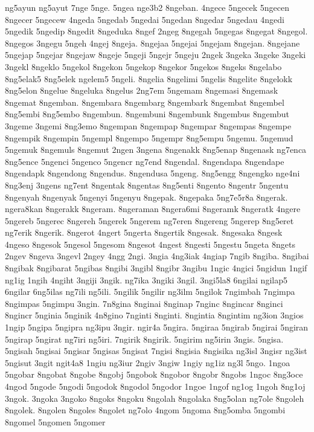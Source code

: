 {ng5ayun ng5ayut 7nge 5nge. 5ngea nge3b2 8ngeban. 4ngece 5ngecek 5ngecen
8ngecer 5ngecew 4ngeda 5ngedab 5ngedai 5ngedan 8ngedar 5ngedau 4ngedi
5ngedik 5ngedip 8ngedit 8ngeduka 8ngef 2ngeg 8ngegah 5ngegas 8ngegat
8ngegol. 8ngegos 3ngegu 5ngeh 4ngej 8ngeja. 8ngejaa 5ngejai 5ngejam
8ngejan. 8ngejane 5ngejap 5ngejar 8ngejaw 8ngeje 5ngeji 5ngejr 5ngeju
2ngek 3ngeka 3ngeke 3ngeki 3ngekl 8ngeklo 5ngekol 8ngekon 5ngekop 8ngekor
5ngekos 8ngeks 8ngelabo 8ng5elak5 8ng5elek ngelem5 5ngeli. 8ngelia
8ngelimi 5ngelis 8ngelite 8ngelokk 8ng5elon 8ngelue 8ngeluka 8ngelus
2ng7em 5ngemam 8ngemasi 8ngemask 8ngemat 8ngemban. 8ngembara 8ngembarg
8ngembark 8ngembat 8ngembel 8ng5embi 8ng5embo 8ngembun. 8ngembuni
8ngembunk 8ngembus 8ngembut 3ngeme 3ngemi 8ng3emo 8ngempan 8ngempap
8ngempar 8ngempas 8ngempe 8ngempik 8ngempin 5ngempl 8ngempo 5ngempr
8ng5empu 5ngemu. 5ngemud 5ngemuk 8ngemuls 8ngemut 2ngen 3ngena 8ngenakk
8ng5enap 8ngenask ng7enca 8ng5ence 5ngenci 5ngenco 5ngencr ng7end
8ngendal. 8ngendapa 8ngendape 8ngendapk 8ngendong 8ngendus. 8ngendusa
5ngeng. 8ng5engg 8ngengko nge4ni 8ng3enj 3ngens ng7ent 8ngentak 8ngentas
8ng5enti 8ngento 8ngentr 5ngentu 8ngenyah 8ngenyak 5ngenyi 5ngenyu
8ngepak. 8ngepaka 5ng7e5r8a 8ngerak. ngera8kan 8ngerakk 8ngeram. 8ngeraman
8ngera6mi 8ngeramk 8ngeratk 4ngere 5ngereb 5ngerec 8ngereh 5ngerek 5ngerem
ng7eren 8ngereng 5ngerep 8ng5eret ng7erik 8ngerik. 8ngerot 4ngert 5ngerta
8ngertik 8ngesak. 8ngesaka 8ngesk 4ngeso 8ngesok 5ngesol 5ngesom 8ngesot
4ngest 8ngesti 5ngestu 5ngeta 8ngets 2ngev 8ngeva 3ngevl 2ngey 4ngg 2ngi.
3ngia 4ng3iak 4ngiap 7ngib 8ngiba. 8ngibai 8ngibak 8ngibarat 5ngibas
8ngibi 3ngibl 8ngibr 3ngibu 1ngic 4ngici 5ngidun 1ngif ng1ig 1ngih 4ngiht
3ngiji 3ngik. ng7ika 3ngiki 3ngil. 3ngi5la8 6ngilai ngilap5 6ngilar
6ng5ilas ng7ili ng5ili. 5ngilik 5ngilir ng3ilm 5ngilok 7ngimbah 7ngimpa
8ngimpas 5ngimpu 3ngin. 7n8gina 8nginai 8nginap 7nginc 8ngincar 8nginci
8ngincr 5nginia 5nginik 4n8gino 7nginti 8nginti. 8ngintia 8ngintim ng3ion
3ngios 1ngip 5ngipa 5ngipra ng3ipu 3ngir. ngir4a 5ngira. 5ngiraa 5ngirab
5ngirai 5ngiran 5ngirap 5ngirat ng7iri ng5iri. 7ngirik 8ngirik. 5ngirim
ng5irin 3ngis. 5ngisa. 5ngisah 5ngisai 5ngisar 5ngisas 5ngisat 7ngisi
8ngisia 8ngisika ng3isl 3ngisr ng3ist 5ngisut 3ngit ngit4a8 1ngiu ng3iur
2ngiv 3ngiw 1ngiy ng1iz ng3l 5ngo. 1ngoa 5ngobar 8ngobat 8ngobe 8ngobj
5ngobok 8ngobor 8ngobr 8ngobs 1ngoc 8ng3oce 4ngod 5ngode 5ngodi 5ngodok
8ngodol 5ngodor 1ngoe 1ngof ng1og 1ngoh 8ng1oj 3ngok. 3ngoka 3ngoko 8ngoks
8ngoku 8ngolah 8ngolaka 8ng5olan ng7ole 8ngoleh 8ngolek. 8ngolen 8ngoles
8ngolet ng7olo 4ngom 5ngoma 8ng5omba 5ngombi 8ngomel 5ngomen 5ngomer
}
